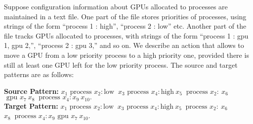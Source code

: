\begin{example}\label{example:gpu}
Suppose configuration information about GPUs allocated to processes are maintained in a text file. One part of  the file stores priorities of processes, using strings of the form ``process 1 : high'', ``process 2 : low'' etc. Another part of the file tracks GPUs allocated to processes, with strings of the form ``process 1 : gpu 1, gpu 2,'', ``process 2 : gpu 3,'' and so on. We describe an action that allows to move a GPU from a low priority process to a high priority one, provided there is still at least one GPU left for the low priority process. The source and target patterns are as follows:\\

\noindent
\begin{flushright}
\textbf{Source Pattern:} $x_1 \text{ process }x_2:\text{low }~x_3 
	\text{ process }x_4:\mathrm{high}~x_5~\text{ process 
}x_2:~x_6 $ ~ $ \text{ gpu } x_7 ~x_8 ~\text{ process }x_4: x_9 ~ x_{10}.$\\
%
\textbf{Target Pattern:} $x_1 \text{ process }x_2:\text{low }~x_3 
\text{ process }x_4:\mathrm{high}~x_5~\text{ process 
}x_2:~x_6 $ ~ $ x_8 ~\text{ process }x_4: x_9  \text{ gpu } x_7 ~ x_{10}$.\\
\end{flushright}


\end{example}
